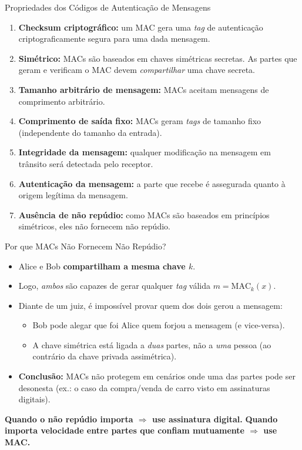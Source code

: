 \documentclass{beamer}
\begin{document}
\begin{frame}{Propriedades dos Códigos de Autenticação de Mensagens}
    \begin{enumerate}
        \footnotesize
        \item \textbf{Checksum criptográfico:} um MAC gera uma \textit{tag} de autenticação criptograficamente segura para uma dada mensagem.
        \item \textbf{Simétrico:} MACs são baseados em chaves simétricas secretas. As partes que geram e verificam o MAC devem \emph{compartilhar} uma chave secreta.
        \item \textbf{Tamanho arbitrário de mensagem:} MACs aceitam mensagens de comprimento arbitrário.
        \item \textbf{Comprimento de saída fixo:} MACs geram \textit{tags} de tamanho fixo (independente do tamanho da entrada).
        \item \textbf{Integridade da mensagem:} qualquer modificação na mensagem em trânsito será detectada pelo receptor.
        \item \textbf{Autenticação da mensagem:} a parte que recebe é assegurada quanto à origem legítima da mensagem.
        \item \textbf{Ausência de não repúdio:} como MACs são baseados em princípios simétricos, eles \alert{não} fornecem não repúdio.
    \end{enumerate}
\end{frame}

\begin{frame}{Por que MACs Não Fornecem Não Repúdio?}
    \begin{itemize}
        \item Alice e Bob \textbf{compartilham a mesma chave $k$}.
        \item Logo, \emph{ambos} são capazes de gerar qualquer \textit{tag} válida $m = \text{MAC}_k(x)$.
        \bigskip\pause
        \item Diante de um juiz, é \alert{impossível provar} quem dos dois gerou a mensagem:
        \begin{itemize}
            \footnotesize
            \item Bob pode alegar que foi Alice quem forjou a mensagem (e vice-versa).
            \item A chave simétrica está ligada a \emph{duas} partes, não a \emph{uma} pessoa (ao contrário da chave privada assimétrica).
        \end{itemize}
        \bigskip\pause
        \item \textbf{Conclusão:} MACs não protegem em cenários onde uma das partes pode ser desonesta (ex.: o caso da compra/venda de carro visto em assinaturas digitais).
    \end{itemize}
    \bigskip
    \begin{tcolorbox}[colback=green!5,colframe=green!50!black,boxrule=0.5pt]
        \footnotesize
        \textbf{Quando o não repúdio importa $\Rightarrow$ use assinatura digital.} \quad
        \textbf{Quando importa velocidade entre partes que confiam mutuamente $\Rightarrow$ use MAC.}
    \end{tcolorbox}
\end{frame}
\end{document}
